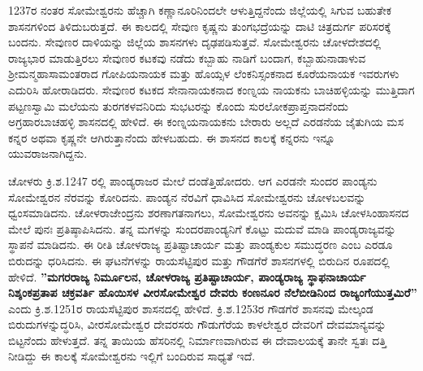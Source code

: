 1237ರ ನಂತರ ಸೋಮೇಶ್ವರನು ಹೆಚ್ಚಾಗಿ ಕಣ್ಣಾನೂರಿನಿಂದಲೇ ಆಳುತ್ತಿದ್ದನೆಂದು ಜಿಲ್ಲೆಯಲ್ಲಿ ಸಿಗುವ ಬಹುತೇಕ ಶಾಸನಗಳಿಂದ ತಿಳಿದುಬರುತ್ತದೆ. ಈ ಕಾಲದಲ್ಲಿ ಸೇವುಣ ಕೃಷ್ಣನು ತುಂಗಭದ್ರೆಯನ್ನು ದಾಟಿ ಚಿತ್ರದುರ್ಗ ಪರಿಸರಕ್ಕೆ ಬಂದನು. ಸೇವುಣರ ದಾಳಿಯನ್ನು ಜಿಲ್ಲೆಯ ಶಾಸನಗಳು ದೃಢಪಡಿಸುತ್ತವೆ. ಸೋಮೇಶ್ವರನು ಚೋಳದೇಶದಲ್ಲಿ ರಾಜ್ಯಭಾರ ಮಾಡುತ್ತಿರಲು ಸೇವುಣರ ಕಟಕವು ನಡೆದು ಕಬ್ಬಾಹು ನಾಡಿಗೆ ಬಂದಾಗ, ಕಬ್ಬಾಹುನಾಡಾಳುವ ಶ‍್ರೀಮನ್ಮಹಾಸಾಮಂತರಾದ ಗೋಪಿಯನಾಯಕ ಮತ್ತು ಹೊಯ್ಸಳ ಲೆಂಕನಿಸ್ಸಂಕನಾದ ಕೂರೆಯನಾಯಕ ಇವರುಗಳು ಎದುರಿಸಿ ಹೋರಾಡಿದರು. ಸೇವುಣರ ಕಟಕದ ಸೇನಾನಾಯಕನಾದ ಕಂಣ್ನಯ ನಾಯಕನು ಬಾಚಿಹಳ್ಳಿಯನ್ನು ಮುತ್ತಿದಾಗ ಪಟ್ಟಣಸ್ವಾಮಿ ಮಲೆಯನು ತುರಗಕಳವನಿರಿದು ಸುಭಟರನ್ನು ಕೊಂದು ಸುರಲೋಕಪ್ರಾಪ್ತನಾದನೆಂದು ಅಗ್ರಹಾರಬಾಚಹಳ್ಳಿ ಶಾಸನದಲ್ಲಿ ಹೇಳಿದೆ. ಈ ಕಂಣ್ನಯನಾಯಕನು ಬೇರಾರು ಅಲ್ಲದೆ ಎರಡನೆಯ ಜೈತುಗಿಯ ಮಸ ಕನ್ನರ ಅಥವಾ ಕೃಷ್ಣನೇ ಆಗಿರುತ್ತಾನೆಂದು ಹೇಳಬಹುದು. ಈ ಶಾಸನದ ಕಾಲಕ್ಕೆ ಕನ್ನರನು ಇನ್ನೂ ಯುವರಾಜನಾಗಿದ್ದನು.

ಚೋಳರು ಕ್ರಿ.ಶ.1247 ರಲ್ಲಿ ಪಾಂಡ್ಯರಾಜರ ಮೇಲೆ ದಂಡೆತ್ತಿಹೋದರು. ಆಗ ಎರಡನೇ ಸುಂದರ ಪಾಂಡ್ಯನು ಸೋಮೇಶ್ವರನ ನೆರವನ್ನು ಕೋರಿದನು. ಪಾಂಡ್ಯನ ನೆರವಿಗೆ ಧಾವಿಸಿದ ಸೋಮೇಶ್ವರನು ಚೋಳಬಲವನ್ನು ಧ್ವಂಸಮಾಡಿದನು. ಚೋಳರಾಜೇಂದ್ರನು ಶರಣಾಗತನಾಗಲು, ಸೋಮೇಶ್ವರನು ಅವನನ್ನು ಕ್ಷಮಿಸಿ ಚೋಳಸಿಂಹಾಸನದ ಮೇಲೆ ಪುನಃ ಪ್ರತಿಷ್ಠಾಪಿ\-ಸಿದನು. ತನ್ನ ಮಗಳನ್ನು ಸುಂದರಪಾಂಡ್ಯನಿಗೆ ಕೊಟ್ಟು ಮದುವೆ ಮಾಡಿ ಪಾಂಡ್ಯರಾಜ್ಯವನ್ನು ಸ್ಥಾಪನೆ ಮಾಡಿದನು. ಈ ರೀತಿ ಚೋಳರಾಜ್ಯ ಪ್ರತಿಷ್ಟಾಚಾರ್ಯ ಮತ್ತು ಪಾಂಡ್ಯಕುಲ ಸಮುದ್ಧರಣ ಎಂಬ ಎರಡೂ ಬಿರುದನ್ನು ಧರಿಸಿದನು. ಈ ಘಟನೆಗಳನ್ನು ರಾಯಸೆಟ್ಟಿಪುರ ಮತ್ತು ಗೌಡಗೆರೆ ಶಾಸನಗಳಲ್ಲಿ ಬಿರುದಿನ ರೂಪದಲ್ಲಿ ಹೇಳಿದೆ. \textbf{''ಮಗರರಾಜ್ಯ ನಿರ್ಮೂಲನ, ಚೋಳರಾಜ್ಯ ಪ್ರತಿಷ್ಟಾಚಾರ್ಯ, ಪಾಂಡ್ಯರಾಜ್ಯ ಸ್ಥಾಫನಾಚಾರ್ಯ ನಿಶ್ಶಂಕಪ್ರತಾಪ ಚಕ್ರವರ್ತಿ ಹೊಯಿಸಳ ವೀರಸೋಮೇಶ್ವರ ದೇವರು ಕಂಣನೂರ ನೆಲೆಬೀಡಿನಿಂದ ರಾಜ್ಯಂಗೆಯುತ್ತಮಿರೆ''} ಎಂದು ಕ್ರಿ.ಶ.1251ರ ರಾಯಸೆಟ್ಟಿಪುರ ಶಾಸನದಲ್ಲಿ ಹೇಳಿದೆ. ಕ್ರಿ.ಶ.1253ರ ಗೌಡಗೆರೆ ಶಾಸನವು ಮೇಲ್ಕಂಡ ಬಿರುದುಗಳನ್ನುದ್ಧರಿಸಿ, ವೀರಸೋಮೇಶ್ವರ ದೇವರಸರು ಗೌಡುಗೆರೆಯ ಕಾಳಲೇಶ್ವರ ದೇವರಿಗೆ ದೇವಮಾನ್ಯವನ್ನು ಬಿಟ್ಟನೆಂದು ಹೇಳುತ್ತದೆ. ತನ್ನ ತಾಯಿಯ ಹೆಸರಿನಲ್ಲಿ ನಿರ್ಮಾಣವಾಗಿರುವ ಈ ದೇವಾಲಯಕ್ಕೆ ತಾನೇ ಸ್ವತಃ ದತ್ತಿ ನೀಡಿದ್ದು ಈ ಕಾಲಕ್ಕೆ ಸೋಮೇಶ್ವರನು ಇಲ್ಲಿಗೆ ಬಂದಿರುವ ಸಾಧ್ಯತೆ ಇದೆ.

